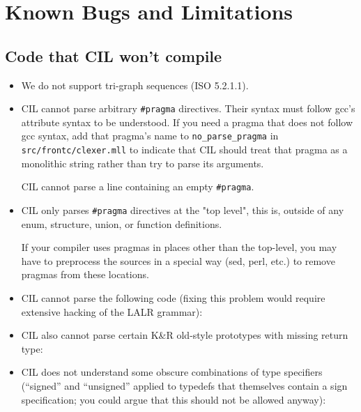 \documentclass{article}
\def\t#1{{\tt #1}}
\begin{document}
\section{Known Bugs and Limitations}

\subsection{Code that CIL won't compile}
\begin{itemize}
\item We do not support tri-graph sequences (ISO 5.2.1.1).

\item CIL cannot parse arbitrary \t{\#pragma} directives.  Their
  syntax must follow gcc's attribute syntax to be understood.  If you
  need a pragma that does not follow gcc syntax, add that pragma's name
  to \t{no\_parse\_pragma} in \t{src/frontc/clexer.mll} to indicate that
  CIL should treat that pragma as a monolithic string rather than try
  to parse its arguments.

  CIL cannot parse a line containing an empty \t{\#pragma}.

\item CIL only parses \t{\#pragma} directives at the "top level", this is,
  outside of any enum, structure, union, or function definitions.

  If your compiler uses pragmas in places other than the top-level,
  you may have to preprocess the sources in a special way (sed, perl,
  etc.) to remove pragmas from these locations.

\item CIL cannot parse the following code (fixing this problem would require
  extensive hacking of the LALR grammar):

\item CIL also cannot parse certain K\&R old-style prototypes with missing
  return type:

\item CIL does not understand some obscure combinations of type
  specifiers (``signed'' and ``unsigned'' applied to typedefs that
  themselves contain a sign specification; you could argue that this
  should not be allowed anyway):


\end{itemize}
\end{document}
